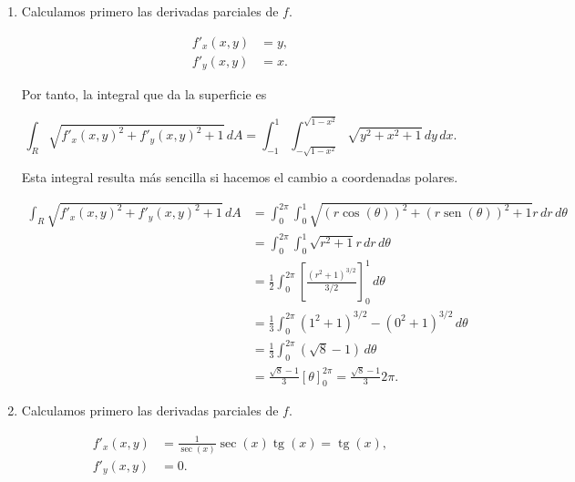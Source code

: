 \documentclass[
  spanish,
  a4paper,
]{scrreport}
\theoremstyle{definition}
\theoremstyle{remark}
\begin{document}
\begin{tcolorbox}[enhanced jigsaw, arc=.35mm, bottomrule=.15mm, bottomtitle=1mm, breakable, colback=white, colbacktitle=quarto-callout-tip-color!10!white, colframe=quarto-callout-tip-color-frame, coltitle=black, left=2mm, leftrule=.75mm, opacityback=0, opacitybacktitle=0.6, rightrule=.15mm, title=\textcolor{quarto-callout-tip-color}{\faLightbulb}\hspace{0.5em}{Solución}, titlerule=0mm, toprule=.15mm, toptitle=1mm]

\begin{enumerate}
\def\labelenumi{\alph{enumi}.}
\item
  Calculamos primero las derivadas parciales de \(f\).

  \begin{align*}
  f'_x(x,y) &= y,\\
  f'_y(x,y) &= x.
  \end{align*}

  Por tanto, la integral que da la superficie es

  \[
  \int_R \sqrt{f'_x(x,y)^2+f'_y(x,y)^2+1}\,dA
  = \int_{-1}^1 \int_{-\sqrt{1-x^2}}^{\sqrt{1-x^2}} \sqrt{y^2+x^2+1}\,dy\,dx.
  \]

  Esta integral resulta más sencilla si hacemos el cambio a coordenadas
  polares.

  \begin{align*}
  \int_R \sqrt{f'_x(x,y)^2+f'_y(x,y)^2+1}\,dA
  &= \int_0^{2\pi} \int_0^1 \sqrt{(r\cos(\theta))^2+(r\operatorname{sen}(\theta))^2+1}r\,dr\,d\theta \\
  &= \int_0^{2\pi} \int_0^1 \sqrt{r^2+1}r\,dr\,d\theta \\
  &= \frac{1}{2} \int_0^{2\pi} \left[\frac{(r^2+1)^{3/2}}{3/2}\right]_0^1\,d\theta \\
  &= \frac{1}{3} \int_0^{2\pi} (1^2+1)^{3/2}-(0^2+1)^{3/2}\,d\theta \\
  &= \frac{1}{3} \int_0^{2\pi} (\sqrt{8}-1)\,d\theta \\
  &= \frac{\sqrt{8}-1}{3} [\theta]_0^{2\pi} 
  = \frac{\sqrt{8}-1}{3}2\pi.
  \end{align*}
\item
  Calculamos primero las derivadas parciales de \(f\).

  \begin{align*}
  f'_x(x,y) &= \frac{1}{\sec(x)}\sec(x)\operatorname{tg}(x) = \operatorname{tg}(x),\\
  f'_y(x,y) &= 0.
  \end{align*}


\end{enumerate}
\end{tcolorbox}
\end{document}

